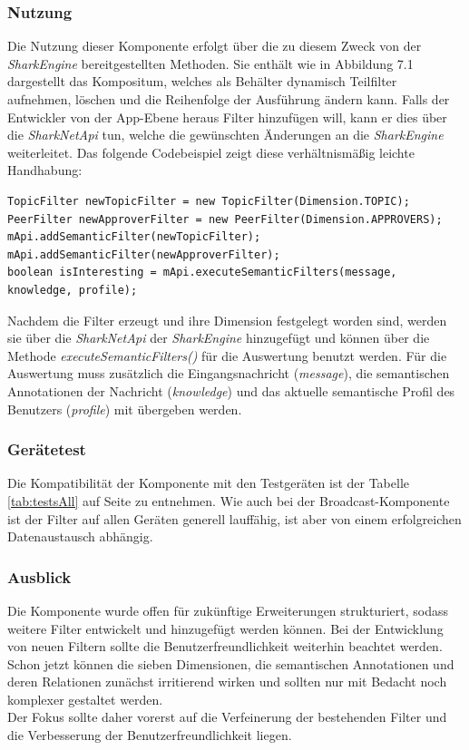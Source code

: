 \subsubsection{Nutzung}
Die Nutzung dieser Komponente erfolgt über die zu diesem Zweck von der \textit{SharkEngine} bereitgestellten Methoden. Sie enthält wie in Abbildung 7.1 dargestellt das Kompositum, welches als Behälter dynamisch Teilfilter aufnehmen, löschen und die Reihenfolge der Ausführung ändern kann. Falls der Entwickler von der App-Ebene heraus Filter hinzufügen will, kann er dies über die \textit{SharkNetApi} tun, welche die gewünschten Änderungen an die \textit{SharkEngine} weiterleitet. Das folgende Codebeispiel zeigt diese ver\-hält\-nis\-mä\-ßig leichte Handhabung:
 \lstset{language=Java, caption=Beispiel für die Anwendung der Filter, label=DescriptiveLabel, numbers=left, numbersep=1em, breaklines=true, basicstyle=\small}
 \begin{lstlisting}
TopicFilter newTopicFilter = new TopicFilter(Dimension.TOPIC);
PeerFilter newApproverFilter = new PeerFilter(Dimension.APPROVERS);
mApi.addSemanticFilter(newTopicFilter);
mApi.addSemanticFilter(newApproverFilter);
boolean isInteresting = mApi.executeSemanticFilters(message, knowledge, profile);
 \end{lstlisting}
Nachdem die Filter erzeugt und ihre Dimension festgelegt worden sind, werden sie über die \textit{SharkNetApi} der \textit{SharkEngine} hinzugefügt und können über die Methode \textit{executeSemanticFilters()} für die Auswertung benutzt werden. Für die Auswertung muss zusätzlich die Eingangsnachricht (\textit{message}), die semantischen Annotationen der Nachricht (\textit{knowledge}) und das aktuelle semantische Profil des Benutzers (\textit{profile}) mit übergeben werden.

\subsubsection{Gerätetest}
Die Kompatibilität der Komponente mit den Testgeräten ist der Tabelle \ref{tab:testsAll} auf Seite \pageref{tab:testsAll} zu entnehmen. Wie auch bei der Broadcast-Komponente ist der Filter auf allen Geräten generell lauffähig, ist aber von einem erfolgreichen Datenaustausch abhängig.

\subsubsection{Ausblick}
Die Komponente wurde offen für zukünftige Erweiterungen strukturiert, sodass weitere Filter entwickelt und hinzugefügt werden können. Bei der Entwicklung von neuen Filtern sollte die Benutzerfreundlichkeit weiterhin beachtet werden. Schon jetzt können die sieben Dimensionen, die semantischen Annotationen und deren Relationen zunächst irritierend wirken und sollten nur mit Bedacht noch komplexer gestaltet werden. 
\\Der Fokus sollte daher vorerst auf die Verfeinerung der bestehenden Filter und die Verbesserung der Benutzerfreundlichkeit liegen. 
\newpage